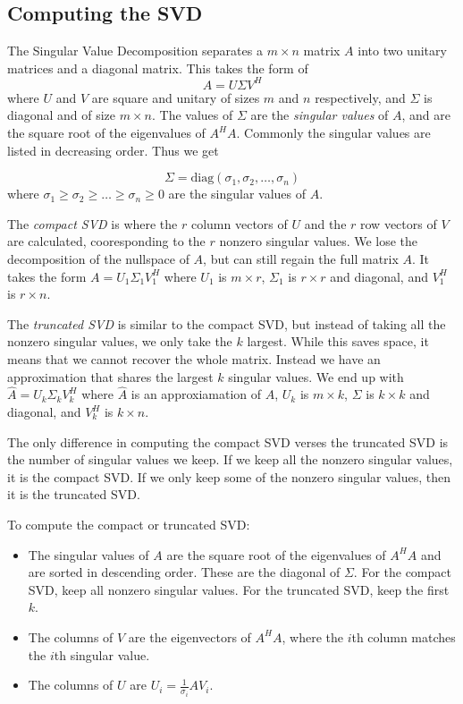 \subsection*{Computing the SVD}


The Singular Value Decomposition separates a $m \times n$ matrix $A$ into two unitary matrices and a diagonal matrix.
This takes the form of 
\begin{equation*}
A = U \Sigma V^H
\end{equation*}
where $U$ and $V$ are square and unitary of sizes $m$ and $n$ respectively, and $\Sigma$ is diagonal and of size $m \times n$.
The values of $\Sigma$ are the \emph{singular values} of $A$, and are the square root of the eigenvalues of $A^HA$.
Commonly the singular values are listed in decreasing order. Thus we get

\begin{equation*}
\Sigma = \mbox{diag}(\sigma_1,\sigma_2,\ldots,\sigma_n)
\end{equation*}
where $\sigma_1 \geq \sigma_2 \geq \ldots \geq \sigma_n \geq 0$ are the singular values of $A$.

The \emph{compact SVD} is where the $r$ column vectors of $U$ and the $r$ row vectors of $V$ are calculated, cooresponding to the $r$ nonzero singular values.
We lose the decomposition of the nullspace of $A$, but can still regain the full matrix $A$.
It takes the form $A= U_1 \Sigma_1 V_1^H$ where $U_1$ is $m\times r$, $\Sigma_1$ is $r\times r$ and diagonal, and $V_1^H$ is $r\times n$.

The \emph{truncated SVD} is similar to the compact SVD, but instead of taking all the nonzero singular values, we only take the $k$ largest.
While this saves space, it means that we cannot recover the whole matrix.
Instead we have an approximation that shares the largest $k$ singular values.
We end up with $\widehat A = U_k\Sigma_k V_k^H$ where $\widehat A$ is an approxiamation of $A$, $U_k$ is $m\times k$, $\Sigma$ is $k \times k$ and diagonal, and $V_k^H$ is $k \times n$.

The only difference in computing the compact SVD verses the truncated SVD is the number of singular values we keep.
If we keep all the nonzero singular values, it is the compact SVD.
If we only keep some of the nonzero singular values, then it is the truncated SVD.

To compute the compact or truncated SVD:

\begin{itemize}
\item The singular values of $A$ are the square root of the eigenvalues of $A^HA$ and are sorted in descending order. These are the diagonal of $\Sigma$. For the compact SVD, keep all nonzero singular values. For the truncated SVD, keep the first $k$.
\item The columns of $V$ are the eigenvectors of $A^HA$, where the $i$th column matches the $i$th singular value.
\item The columns of $U$ are $U_i = \frac{1}{\sigma_i} AV_i$.
\end{itemize}

